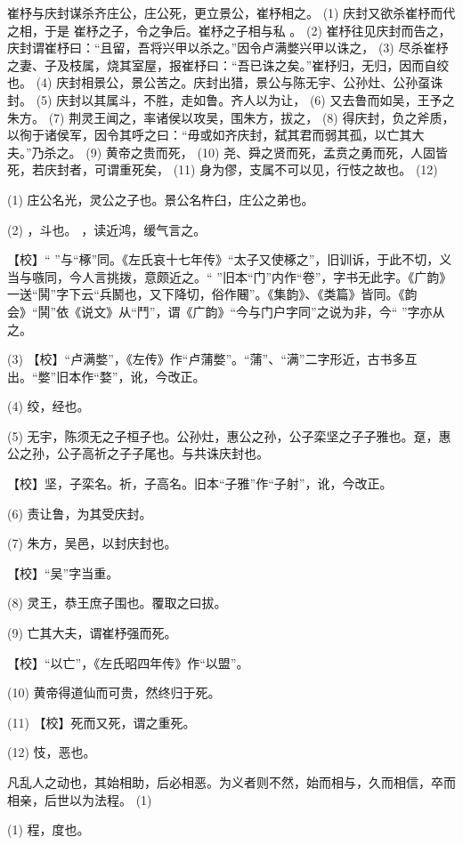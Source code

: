 \documentclass[12pt,UTF8]{ctexbook}
\begin{document}
崔杼与庆封谋杀齐庄公，庄公死，更立景公，崔杼相之。 (1) 庆封又欲杀崔杼而代之相，于是 崔杼之子，令之争后。崔杼之子相与私 。 (2) 崔杼往见庆封而告之，庆封谓崔杼曰：“且留，吾将兴甲以杀之。”因令卢满嫳兴甲以诛之， (3) 尽杀崔杼之妻、子及枝属，烧其室屋，报崔杼曰：“吾已诛之矣。”崔杼归，无归，因而自绞也。 (4) 庆封相景公，景公苦之。庆封出猎，景公与陈无宇、公孙灶、公孙虿诛封。 (5) 庆封以其属斗，不胜，走如鲁。齐人以为让， (6) 又去鲁而如吴，王予之朱方。 (7) 荆灵王闻之，率诸侯以攻吴，围朱方，拔之， (8) 得庆封，负之斧质，以徇于诸侯军，因令其呼之曰：“毋或如齐庆封，弑其君而弱其孤，以亡其大夫。”乃杀之。 (9) 黄帝之贵而死， (10) 尧、舜之贤而死，孟贲之勇而死，人固皆死，若庆封者，可谓重死矣， (11) 身为僇，支属不可以见，行忮之故也。 (12)

(1) 庄公名光，灵公之子也。景公名杵臼，庄公之弟也。

(2) ，斗也。 ，读近鸿，缓气言之。

【校】“ ”与“椓”同。《左氏哀十七年传》“太子又使椓之”，旧训诉，于此不切，义当与嗾同，今人言挑拨，意颇近之。“ ”旧本“门”内作“卷”，字书无此字。《广韵》一送“鬨”字下云“兵鬭也，又下降切，俗作闀”。《集韵》、《类篇》皆同。《韵会》“鬨”依《说文》从“鬥”，谓《广韵》“今与门户字同”之说为非，今“ ”字亦从之。

(3) 【校】“卢满嫳”，《左传》作“卢蒲嫳”。“蒲”、“满”二字形近，古书多互出。“嫳”旧本作“婺”，讹，今改正。

(4) 绞，经也。

(5) 无宇，陈须无之子桓子也。公孙灶，惠公之孙，公子栾坚之子子雅也。趸，惠公之孙，公子高祈之子子尾也。与共诛庆封也。

【校】坚，子栾名。祈，子高名。旧本“子雅”作“子射”，讹，今改正。

(6) 责让鲁，为其受庆封。

(7) 朱方，吴邑，以封庆封也。

【校】“吴”字当重。

(8) 灵王，恭王庶子围也。覆取之曰拔。

(9) 亡其大夫，谓崔杼强而死。

【校】“以亡”，《左氏昭四年传》作“以盟”。

(10) 黄帝得道仙而可贵，然终归于死。

(11) 【校】死而又死，谓之重死。

(12) 忮，恶也。

凡乱人之动也，其始相助，后必相恶。为义者则不然，始而相与，久而相信，卒而相亲，后世以为法程。 (1)

(1) 程，度也。
\end{document}

